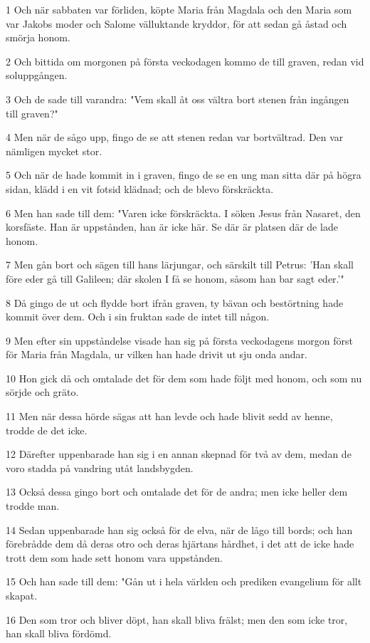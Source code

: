 \par 1 Och när sabbaten var förliden, köpte Maria från Magdala och den Maria som var Jakobs moder och Salome välluktande kryddor, för att sedan gå åstad och smörja honom.
\par 2 Och bittida om morgonen på första veckodagen kommo de till graven, redan vid soluppgången.
\par 3 Och de sade till varandra: "Vem skall åt oss vältra bort stenen från ingången till graven?"
\par 4 Men när de sågo upp, fingo de se att stenen redan var bortvältrad. Den var nämligen mycket stor.
\par 5 Och när de hade kommit in i graven, fingo de se en ung man sitta där på högra sidan, klädd i en vit fotsid klädnad; och de blevo förskräckta.
\par 6 Men han sade till dem: "Varen icke förskräckta. I söken Jesus från Nasaret, den korsfäste. Han är uppstånden, han är icke här. Se där är platsen där de lade honom.
\par 7 Men gån bort och sägen till hans lärjungar, och särskilt till Petrus: 'Han skall före eder gå till Galileen; där skolen I få se honom, såsom han bar sagt eder.'"
\par 8 Då gingo de ut och flydde bort ifrån graven, ty bävan och bestörtning hade kommit över dem. Och i sin fruktan sade de intet till någon.
\par 9 Men efter sin uppståndelse visade han sig på första veckodagens morgon först för Maria från Magdala, ur vilken han hade drivit ut sju onda andar.
\par 10 Hon gick då och omtalade det för dem som hade följt med honom, och som nu sörjde och gräto.
\par 11 Men när dessa hörde sägas att han levde och hade blivit sedd av henne, trodde de det icke.
\par 12 Därefter uppenbarade han sig i en annan skepnad för två av dem, medan de voro stadda på vandring utåt landsbygden.
\par 13 Också dessa gingo bort och omtalade det för de andra; men icke heller dem trodde man.
\par 14 Sedan uppenbarade han sig också för de elva, när de lågo till bords; och han förebrådde dem då deras otro och deras hjärtans hårdhet, i det att de icke hade trott dem som hade sett honom vara uppstånden.
\par 15 Och han sade till dem: "Gån ut i hela världen och prediken evangelium för allt skapat.
\par 16 Den som tror och bliver döpt, han skall bliva frälst; men den som icke tror, han skall bliva fördömd.
